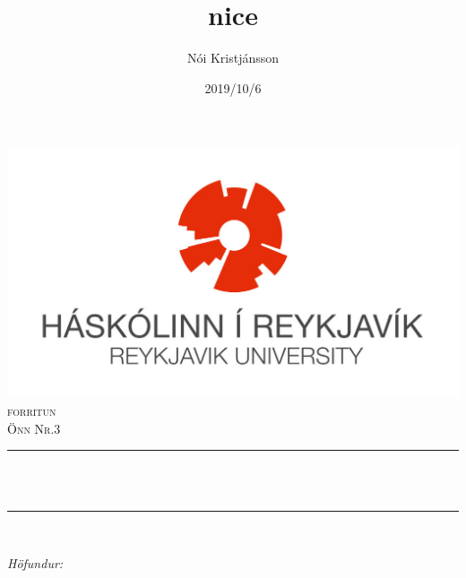 \documentclass[12pt]{article}
\title{nice}
\author{Nói Kristjánsson}
\date{2019/10/6}
\makeatletter
\let\thetitle\@title
\let\theauthor\@author
\let\thedate\@date
\makeatother
\begin{document}

    \begin{titlepage}
        \centering
        \vspace*{0.5 cm}
        \includegraphics[scale = 1.15]{HR_logo_midjad_hires.jpg}\\[1.0 cm]	%
        \textsc{\Large forritun}\\[0.5 cm]				%
        \textsc{\large Önn Nr.3}\\[0.5 cm]				%
        \rule{\linewidth}{0.2 mm} \\[0.4 cm]
        { \huge \bfseries \thetitle}\\
        \rule{\linewidth}{0.2 mm} \\[1.5 cm]
        
        \begin{minipage}{0.4\textwidth}
            \begin{flushleft} \large
                \emph{Höfundur:}\\
                \theauthor
                \end{flushleft}
                \end{minipage}~
                \begin{minipage}{0.4\textwidth}
                \begin{flushright} \large
            \end{flushright}
        \end{minipage}\\[2 cm]
        
        {\large \thedate}\\[2 cm]
    
        \vfill
        
    \end{titlepage}


    
\end{document}
